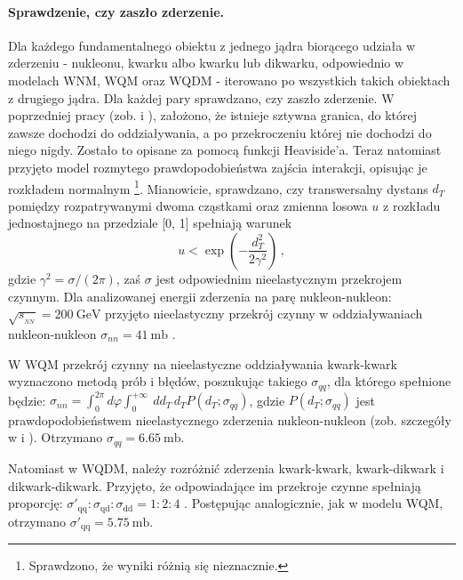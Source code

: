 \documentclass[a4paper,12pt]{article}
\begin{document}
\paragraph{Sprawdzenie, czy zaszło zderzenie.}
Dla każdego fundamentalnego obiektu z jednego jądra biorącego udziała w zderzeniu - nukleonu, kwarku albo kwarku lub dikwarku, odpowiednio w modelach WNM, WQM oraz WQDM - iterowano po wszystkich takich obiektach z drugiego jądra. Dla każdej pary sprawdzano, czy zaszło zderzenie. W poprzedniej pracy (zob. \cite{Barej:pracaInz18} i \cite{Barej:2017kcw}), założono, że istnieje sztywna granica, do której zawsze dochodzi do oddziaływania, a po przekroczeniu której nie dochodzi do niego nigdy. Zostało to opisane za pomocą funkcji Heaviside'a. Teraz natomiast przyjęto model rozmytego prawdopodobieństwa zajścia interakcji, opisując je rozkładem normalnym \footnote{Sprawdzono, że wyniki różnią się nieznacznie.}. Mianowicie, sprawdzano, czy transwersalny dystans $d_T$ pomiędzy rozpatrywanymi dwoma cząstkami oraz zmienna losowa $u$ z rozkładu jednostajnego na przedziale [0, 1] spełniają warunek 
\begin{equation}
u < \exp\left(-\frac{d_T^2}{2\gamma^2}\right)\,,
\end{equation}
gdzie $\gamma^2 = \sigma/(2\pi)$, zaś $\sigma$ jest odpowiednim nieelastycznym przekrojem czynnym. Dla analizowanej energii zderzenia na parę nukleon-nukleon: $\sqrt{s_{_{NN}}} = 200~\text{GeV}$ przyjęto nieelastyczny przekrój czynny w oddziaływaniach nukleon-nukleon $\sigma_{nn} = 41~\text{mb}$ \cite{Loizides:2014vua}. 

W WQM przekrój czynny na nieelastyczne oddziaływania kwark-kwark wyznaczono metodą prób i błędów, poszukując takiego $\sigma_{qq}$, dla którego spełnione będzie: $ \sigma_{nn} = \int_{0}^{2 \pi} d\varphi \int_{0}^{+ \infty}\:dd_T\,d_T P(d_T; \sigma_{qq})$, gdzie $P(d_T; \sigma_{qq})$ jest prawdopodobieństwem nieelastycznego zderzenia nukleon-nukleon (zob. szczegóły w \cite{Barej:pracaInz18} i \cite{Barej:2017kcw}). Otrzymano $\sigma_{qq} = 6.65~\text{mb}$.

Natomiast w WQDM, należy rozróżnić zderzenia kwark-kwark, kwark-dikwark i dikwark-dikwark. Przyjęto, że odpowiadające im przekroje czynne spełniają proporcję: $\sigma'_{\text{qq}}:\sigma_{\text{qd}}:\sigma_{\text{dd}}=1:2:4$ \cite{	Bialas:2006kw}. Postępując analogicznie, jak w modelu WQM, otrzymano $\sigma'_{\text{qq}} = 5.75~\text{mb}$.
\end{document}
